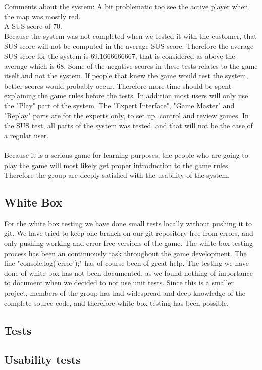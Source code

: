 Comments about the system: A bit problematic too see the active player when the map was mostly red.\\

A SUS score of 70.\\

Because the system was not completed when we tested it with the customer, that SUS score will not be computed in the average SUS score. Therefore the average SUS score for the system is 69.1666666667, that is considered as above the average which is 68. Some of the negative scores in these tests relates to the game itself and not the system. If people that knew the game would test the system, better scores would probably occur. Therefore more time should be spent explaining the game rules before the tests. In addition most users will only use the "Play" part of the system. The "Expert Interface", "Game Master" and "Replay" parts are for the experts only, to set up, control and review games. In the SUS test, all parts of the system was tested, and that will not be the case of a regular user.\\
\\
Because it is a serious game for learning purposes, the people who are going to play the game will most likely get proper introduction to the game rules. Therefore the group are deeply satisfied with the usability of the system. 
\subsection{White Box}
For the white box testing we have done small tests locally without pushing it to git. We have tried to keep one branch on our git repository free from errors, and only pushing working and error free versions of the game. The white box testing process has been an continuously task throughout the game development. The line "console.log('error');" has of course been of great help. The testing we have done of white box  has not been documented, as we found nothing of importance to document when we decided to not use unit tests. Since this is a smaller project, members of the group has had widespread and deep knowledge of the complete source code, and therefore white box testing has been possible.


\subsection{Tests}




\subsection{Usability tests}


